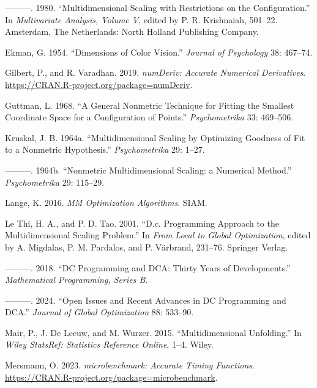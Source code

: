 \documentclass[
  12pt,
]{article}
\newlength{\cslhangindent}
\newenvironment{CSLReferences}[2] %
 {\begin{list}{}{%
  \setlength{\itemindent}{0pt}
  \setlength{\leftmargin}{0pt}
  \setlength{\parsep}{0pt}
  \ifodd #1
   \setlength{\leftmargin}{\cslhangindent}
   \setlength{\itemindent}{-1\cslhangindent}
  \fi
  \setlength{\itemsep}{#2\baselineskip}}}
 {\end{list}}
\begin{document}
\begin{CSLReferences}{1}{0}
---------. 1980. {``Multidimensional Scaling with Restrictions on the Configuration.''} In \emph{Multivariate Analysis, Volume {V}}, edited by P. R. Krishnaiah, 501--22. Amsterdam, The Netherlands: North Holland Publishing Company.

Ekman, G. 1954. {``{Dimensions of Color Vision}.''} \emph{Journal of Psychology} 38: 467--74.

Gilbert, P., and R. Varadhan. 2019. \emph{{numDeriv: Accurate Numerical Derivatives}}. \url{https://CRAN.R-project.org/package=numDeriv}.

Guttman, L. 1968. {``{A General Nonmetric Technique for Fitting the Smallest Coordinate Space for a Configuration of Points}.''} \emph{Psychometrika} 33: 469--506.

Kruskal, J. B. 1964a. {``{Multidimensional Scaling by Optimizing Goodness of Fit to a Nonmetric Hypothesis}.''} \emph{Psychometrika} 29: 1--27.

---------. 1964b. {``{Nonmetric Multidimensional Scaling: a Numerical Method}.''} \emph{Psychometrika} 29: 115--29.

Lange, K. 2016. \emph{MM Optimization Algorithms}. SIAM.

Le Thi, H. A., and P. D. Tao. 2001. {``D.c. Programming Approach to the Multidimensional Scaling Problem.''} In \emph{From Local to Global Optimization}, edited by A. Migdalas, P. M. Pardalos, and P. Värbrand, 231--76. Springer Verlag.

---------. 2018. {``{DC Programming and DCA: Thirty Years of Developments}.''} \emph{Mathematical Programming, Series B}.

---------. 2024. {``Open Issues and Recent Advances in DC Programming and DCA.''} \emph{Journal of Global Optimization} 88: 533--90.

Mair, P., J. De Leeuw, and M. Wurzer. 2015. {``{Multidimensional Unfolding}.''} In \emph{Wiley {StatsRef}: Statistics Reference Online}, 1--4. Wiley.

Mersmann, O. 2023. \emph{{microbenchmark: Accurate Timing Functions}}. \url{https://CRAN.R-project.org/package=microbenchmark}.


\end{CSLReferences}
\end{document}
